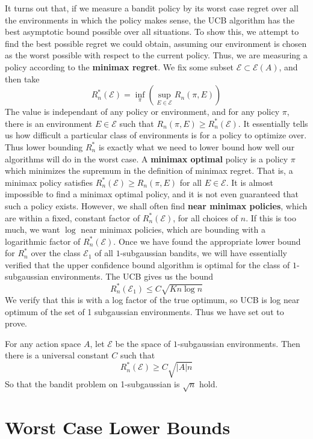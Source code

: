 It turns out that, if we measure a bandit policy by its worst case regret over all the environments in which the policy makes sense, the UCB algorithm has the best asymptotic bound possible over all situations. To show this, we attempt to find the best possible regret we could obtain, assuming our environment is chosen as the worst possible with respect to the current policy. Thus, we are measuring a policy according to the {\bf minimax regret}. We fix some subset $\mathcal{E} \subset \mathcal{E}(A)$, and then take
%
\[ R_n^*(\mathcal{E}) = \inf_\pi \left( \sup_{E \in \mathcal{E}} R_n(\pi, E) \right) \]
%
The value is independant of any policy or environment, and for any policy $\pi$, there is an environment $E \in \mathcal{E}$ such that $R_n(\pi, E) \geq R_n^*(\mathcal{E})$. It essentially tells us how difficult a particular class of environments is for a policy to optimize over. Thus lower bounding $R_n^*$ is exactly what we need to lower bound how well our algorithms will do in the worst case. A {\bf minimax optimal} policy is a policy $\pi$ which minimizes the supremum in the definition of minimax regret. That is, a minimax policy satisfies $R_n^*(\mathcal{E}) \geq R_n(\pi, E)$ for all $E \in \mathcal{E}$. It is almost impossible to find a minimax optimal policy, and it is not even guaranteed that such a policy exists. However, we shall often find {\bf near minimax policies}, which are within a fixed, constant factor of $R_n^*(\mathcal{E})$, for all choices of $n$. If this is too much, we want $\log$ near minimax policies, which are bounding with a logarithmic factor of $R_n^*(\mathcal{E})$. Once we have found the appropriate lower bound for $R_n^*$ over the class $\mathcal{E}_1$ of all $1$-subgaussian bandits, we will have essentially verified that the upper confidence bound algorithm is optimal for the class of $1$-subgaussian environments. The UCB gives us the bound
%
\[ R_n^*(\mathcal{E}_1) \leq C \sqrt{K n \log n} \]
%
We verify that this is with a log factor of the true optimum, so UCB is log near optimum of the set of 1 subgaussian environments. Thus we have set out to prove.

\begin{theorem}
    For any action space $A$, let $\mathcal{E}$ be the space of $1$-subgaussian environments. Then there is a universal constant $C$ such that
    \[ R_n^*(\mathcal{E}) \geq C \sqrt{|A| n} \]
    So that the bandit problem on 1-subgaussian is $\sqrt{n}$ hold.
\end{theorem}

\section{Worst Case Lower Bounds}

